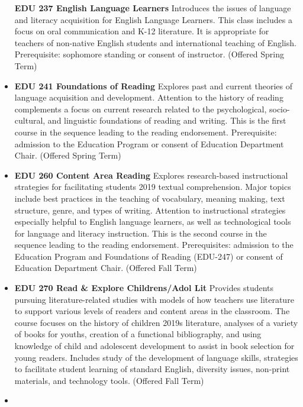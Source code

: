 \documentclass[
  letterpaper,
]{scrbook}
\begin{document}
\begin{itemize}
  \textbf{EDU 237 English Language Learners} Introduces the issues of
  language and literacy acquisition for English Language Learners. This
  class includes a focus on oral communication and K-12 literature. It
  is appropriate for teachers of non-native English students and
  international teaching of English. Prerequisite: sophomore standing or
  consent of instructor. (Offered Spring Term)\\
\item
  \textbf{EDU 241 Foundations of Reading} Explores past and current
  theories of language acquisition and development. Attention to the
  history of reading complements a focus on current research related to
  the psychological, socio-cultural, and linguistic foundations of
  reading and writing. This is the first course in the sequence leading
  to the reading endorsement. Prerequisite: admission to the Education
  Program or consent of Education Department Chair. (Offered Spring
  Term)\\
\item
  \textbf{EDU 260 Content Area Reading} Explores research-based
  instructional strategies for facilitating students 2019 textual
  comprehension. Major topics include best practices in the teaching of
  vocabulary, meaning making, text structure, genre, and types of
  writing. Attention to instructional strategies especially helpful to
  English language learners, as well as technological tools for language
  and literacy instruction. This is the second course in the sequence
  leading to the reading endorsement. Prerequisites: admission to the
  Education Program and Foundations of Reading (EDU-247) or consent of
  Education Department Chair. (Offered Fall Term)\\
\item
  \textbf{EDU 270 Read \& Explore Childrens/Adol Lit} Provides students
  pursuing literature-related studies with models of how teachers use
  literature to support various levels of readers and content areas in
  the classroom. The course focuses on the history of children 2019s
  literature, analyses of a variety of books for youths, creation of a
  functional bibliography, and using knowledge of child and adolescent
  development to assist in book selection for young readers. Includes
  study of the development of language skills, strategies to facilitate
  student learning of standard English, diversity issues, non-print
  materials, and technology tools. (Offered Fall Term)\\
\item

\end{itemize}
\end{document}
